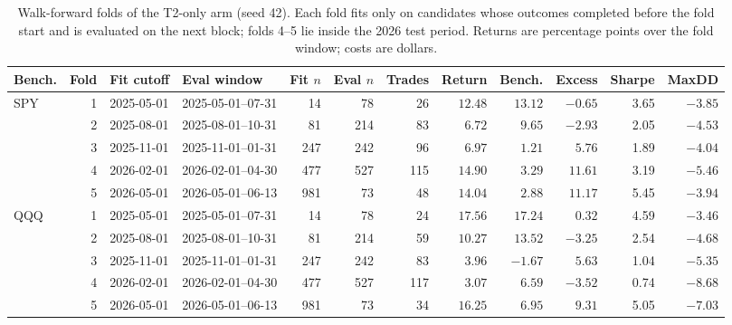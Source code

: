 \begin{table}[t]
\caption{Walk-forward folds of the T2-only arm (seed 42). Each fold fits only on candidates whose outcomes completed before the fold start and is evaluated on the next block; folds 4--5 lie inside the 2026 test period. Returns are percentage points over the fold window; costs are dollars.}
\label{tab:folds}
\centering
\footnotesize
\setlength{\tabcolsep}{3.2pt}
\begin{tabular}{lrllrrrrrrrr}
\toprule
Bench. & Fold & Fit cutoff & Eval window & Fit $n$ & Eval $n$ & Trades & Return & Bench. & Excess & Sharpe & MaxDD \\
\midrule
SPY & 1 & 2025-05-01 & 2025-05-01--07-31 & 14 & 78 & 26 & $12.48$ & $13.12$ & $-0.65$ & 3.65 & $-3.85$ \\
 & 2 & 2025-08-01 & 2025-08-01--10-31 & 81 & 214 & 83 & $6.72$ & $9.65$ & $-2.93$ & 2.05 & $-4.53$ \\
 & 3 & 2025-11-01 & 2025-11-01--01-31 & 247 & 242 & 96 & $6.97$ & $1.21$ & $5.76$ & 1.89 & $-4.04$ \\
 & 4 & 2026-02-01 & 2026-02-01--04-30 & 477 & 527 & 115 & $14.90$ & $3.29$ & $11.61$ & 3.19 & $-5.46$ \\
 & 5 & 2026-05-01 & 2026-05-01--06-13 & 981 & 73 & 48 & $14.04$ & $2.88$ & $11.17$ & 5.45 & $-3.94$ \\
\midrule
QQQ & 1 & 2025-05-01 & 2025-05-01--07-31 & 14 & 78 & 24 & $17.56$ & $17.24$ & $0.32$ & 4.59 & $-3.46$ \\
 & 2 & 2025-08-01 & 2025-08-01--10-31 & 81 & 214 & 59 & $10.27$ & $13.52$ & $-3.25$ & 2.54 & $-4.68$ \\
 & 3 & 2025-11-01 & 2025-11-01--01-31 & 247 & 242 & 83 & $3.96$ & $-1.67$ & $5.63$ & 1.04 & $-5.35$ \\
 & 4 & 2026-02-01 & 2026-02-01--04-30 & 477 & 527 & 117 & $3.07$ & $6.59$ & $-3.52$ & 0.74 & $-8.68$ \\
 & 5 & 2026-05-01 & 2026-05-01--06-13 & 981 & 73 & 34 & $16.25$ & $6.95$ & $9.31$ & 5.05 & $-7.03$ \\
\bottomrule
\end{tabular}
\end{table}
